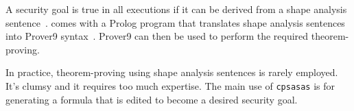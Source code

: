 \documentclass[12pt]{article}
\begin{document}
A security goal is true in all executions if it can be derived from a
shape analysis sentence~\cite{Ramsdell12}.  {\cpsa} comes with a
Prolog program that translates shape analysis sentences into Prover9
syntax~\cite{prover9}.  Prover9 can then be used to perform the
required theorem-proving.

In practice, theorem-proving using shape analysis sentences is rarely
employed.  It's clumsy and it requires too much expertise.  The main
use of \texttt{cpsasas} is for generating a formula that is edited to
become a desired security goal.



\end{document}
